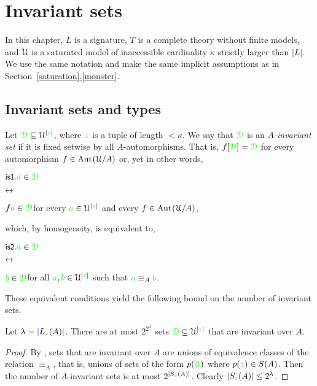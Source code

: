 \documentclass[creche.tex]{subfiles}
\begin{document}
\chapter{Invariant sets}
\label{invariant}

\def\medrel#1{\parbox[t]{6ex}{$\displaystyle\hfil #1$}}
\def\ceq#1#2#3{\parbox[t]{16ex}{$\displaystyle #1$}\medrel{#2}{$\displaystyle #3$}}

In this chapter, $L$ is a signature, $T$ is a complete theory without finite models, and $\EuScript U$ is a saturated model of inaccessible cardinality $\kappa$ strictly larger than $|L|$.
We use the same notation and make the same implicit assumptions as in Section~\hyperref[monster]{\ref*{saturation}.\ref*{monster}}.

\section{Invariant sets and types}\label{invariant_sets}

Let ${\color{green}\EuScript D}\subseteq\EuScript U^{|{\color{green} z}|}$, where ${\color{green} z}$ is a tuple of length $<\kappa$.
We say that ${\color{green}\EuScript D}$ is an \emph{$A$-invariant set} if it is fixed setwise by all $A$-automorphisms.
That is, $f[{\color{green}\EuScript D}]={\color{green}\EuScript D}$ for every automorphism $f\in{\rm Aut\kern.15ex}(\EuScript U/A)$ or, yet in other words,

\ceq{\ssf{is1.}\hfill {\gr a}\in\grD}{\iff}{f{\gr a}\in\grD}\hfill for every ${\color{green} a}\in\EuScript U^{|{\color{green} z}|}$ and every $f\in{\rm Aut\kern.15ex}(\EuScript U/A)$,

which, by homogeneity, is equivalent to,

\ceq{\ssf{is2.}\hfill {\gr a}\in\grD}{\iff}{{\gr b}\in\grD}\hfill for all ${\color{green} a},{\color{green} b}\in\EuScript U^{|{\color{green} z}|}$ such that ${\color{green} a}\equiv_A{\color{green} b}$.

These equivalent conditions yield the following bound on the number of invariant sets.

\begin{proposition}\label{prop_numberIS}
Let $\lambda=|L_{\color{green} z}(A)|$.
There are at most $2^{2^{\lambda}}$ sets ${\color{green}\EuScript D}\subseteq\EuScript U^{|{\color{green} z}|}$ that are invariant over $A$.
\end{proposition}
\begin{proof}
By , sets that are invariant over $A$ are unions of equivalence classes of the relation $\equiv_A$, that is, unions of sets of the form $p({\color{green}\EuScript U})$ where $p({\color{green} z})\in S(A)$.
Then the number of $A$-invariant sets is at most $2^{|S_{\color{green} z}(A)|}$.
Clearly $|S_{\color{green} z}(A)|\le 2^\lambda$.
\end{proof} 
\end{document}

